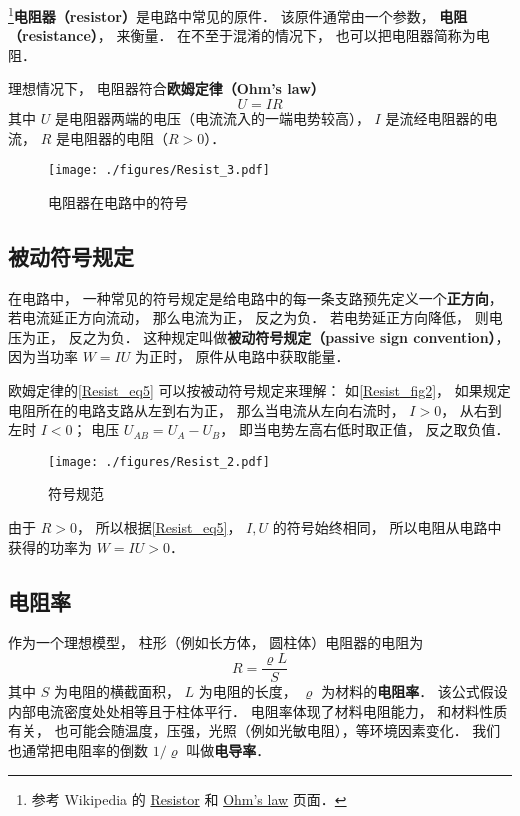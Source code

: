 

\footnote{参考 Wikipedia 的 \href{https://en.wikipedia.org/wiki/Resistor}{Resistor} 和 \href{https://en.wikipedia.org/wiki/Ohm's_law}{Ohm's law} 页面．}\textbf{电阻器（resistor）}是电路中常见的原件． 该原件通常由一个参数， \textbf{电阻（resistance）}， 来衡量． 在不至于混淆的情况下， 也可以把电阻器简称为电阻．

理想情况下， 电阻器符合\textbf{欧姆定律（Ohm's law）}
\begin{equation}\label{Resist_eq5}
U = IR
\end{equation}
其中 $U$ 是电阻器两端的电压（电流流入的一端电势较高）， $I$ 是流经电阻器的电流， $R$ 是电阻器的电阻（$R > 0$）．

\begin{figure}[ht]
\centering
\texttt{[image: ./figures/Resist\_3.pdf]}
\caption{电阻器在电路中的符号} \label{Resist_fig3}
\end{figure}

\subsection{被动符号规定}
在电路中， 一种常见的符号规定是给电路中的每一条支路预先定义一个\textbf{正方向}， 若电流延正方向流动， 那么电流为正， 反之为负． 若电势延正方向降低， 则电压为正， 反之为负． 这种规定叫做\textbf{被动符号规定（passive sign convention）}， 因为当功率 $W = IU$ 为正时， 原件从电路中获取能量．

欧姆定律的\autoref{Resist_eq5} 可以按被动符号规定来理解： 如\autoref{Resist_fig2}， 如果规定电阻所在的电路支路从左到右为正， 那么当电流从左向右流时， $I > 0$， 从右到左时 $I < 0$； 电压 $U_{AB} = U_A - U_B$， 即当电势左高右低时取正值， 反之取负值．

\begin{figure}[ht]
\centering
\texttt{[image: ./figures/Resist\_2.pdf]}
\caption{符号规范} \label{Resist_fig2}
\end{figure}

由于 $R > 0$， 所以根据\autoref{Resist_eq5}， $I, U$ 的符号始终相同， 所以电阻从电路中获得的功率为 $W = IU > 0$．

\subsection{电阻率}
作为一个理想模型， 柱形（例如长方体， 圆柱体）电阻器的电阻为
\begin{equation}
R = \frac{\varrho L}{S} 
\end{equation}
其中 $S$ 为电阻的横截面积， $L$ 为电阻的长度， $\varrho$ 为材料的\textbf{电阻率}． 该公式假设内部电流密度处处相等且于柱体平行． 电阻率体现了材料电阻能力， 和材料性质有关， 也可能会随温度，压强，光照（例如光敏电阻），等环境因素变化． 我们也通常把电阻率的倒数 $1/\varrho$ 叫做\textbf{电导率}．

